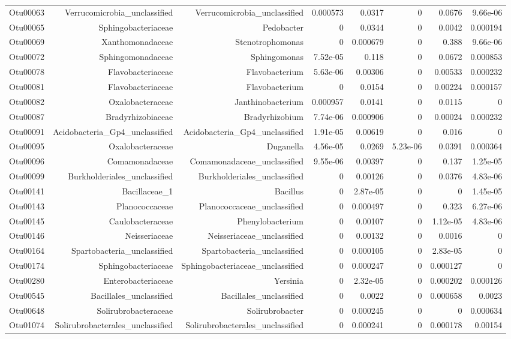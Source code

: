 \begin{table}[ht]
\begin{tabular}{crrrrrrr}
  Otu00063 & Verrucomicrobia\_unclassified & Verrucomicrobia\_unclassified & 0.000573 & 0.0317 & 0 & 0.0676 & 9.66e-06 \\ 
  Otu00065 & Sphingobacteriaceae & Pedobacter & 0 & 0.0344 & 0 & 0.0042 & 0.000194 \\ 
  Otu00069 & Xanthomonadaceae & Stenotrophomonas & 0 & 0.000679 & 0 & 0.388 & 9.66e-06 \\ 
  Otu00072 & Sphingomonadaceae & Sphingomonas & 7.52e-05 & 0.118 & 0 & 0.0672 & 0.000853 \\ 
  Otu00078 & Flavobacteriaceae & Flavobacterium & 5.63e-06 & 0.00306 & 0 & 0.00533 & 0.000232 \\ 
  Otu00081 & Flavobacteriaceae & Flavobacterium & 0 & 0.0154 & 0 & 0.00224 & 0.000157 \\ 
  Otu00082 & Oxalobacteraceae & Janthinobacterium & 0.000957 & 0.0141 & 0 & 0.0115 & 0 \\ 
  Otu00087 & Bradyrhizobiaceae & Bradyrhizobium & 7.74e-06 & 0.000906 & 0 & 0.00024 & 0.000232 \\ 
  Otu00091 & Acidobacteria\_Gp4\_unclassified & Acidobacteria\_Gp4\_unclassified & 1.91e-05 & 0.00619 & 0 & 0.016 & 0 \\ 
  Otu00095 & Oxalobacteraceae & Duganella & 4.56e-05 & 0.0269 & 5.23e-06 & 0.0391 & 0.000364 \\ 
  Otu00096 & Comamonadaceae & Comamonadaceae\_unclassified & 9.55e-06 & 0.00397 & 0 & 0.137 & 1.25e-05 \\ 
  Otu00099 & Burkholderiales\_unclassified & Burkholderiales\_unclassified & 0 & 0.00126 & 0 & 0.0376 & 4.83e-06 \\ 
  Otu00141 & Bacillaceae\_1 & Bacillus & 0 & 2.87e-05 & 0 & 0 & 1.45e-05 \\ 
  Otu00143 & Planococcaceae & Planococcaceae\_unclassified & 0 & 0.000497 & 0 & 0.323 & 6.27e-06 \\ 
  Otu00145 & Caulobacteraceae & Phenylobacterium & 0 & 0.00107 & 0 & 1.12e-05 & 4.83e-06 \\ 
  Otu00146 & Neisseriaceae & Neisseriaceae\_unclassified & 0 & 0.00132 & 0 & 0.0016 & 0 \\ 
  Otu00164 & Spartobacteria\_unclassified & Spartobacteria\_unclassified & 0 & 0.000105 & 0 & 2.83e-05 & 0 \\ 
  Otu00174 & Sphingobacteriaceae & Sphingobacteriaceae\_unclassified & 0 & 0.000247 & 0 & 0.000127 & 0 \\ 
  Otu00280 & Enterobacteriaceae & Yersinia & 0 & 2.32e-05 & 0 & 0.000202 & 0.000126 \\ 
  Otu00545 & Bacillales\_unclassified & Bacillales\_unclassified & 0 & 0.0022 & 0 & 0.000658 & 0.0023 \\ 
  Otu00648 & Solirubrobacteraceae & Solirubrobacter & 0 & 0.000245 & 0 & 0 & 0.000634 \\ 
  Otu01074 & Solirubrobacterales\_unclassified & Solirubrobacterales\_unclassified & 0 & 0.000241 & 0 & 0.000178 & 0.00154 \\ 
   \hline
\end{tabular}
\end{table}
